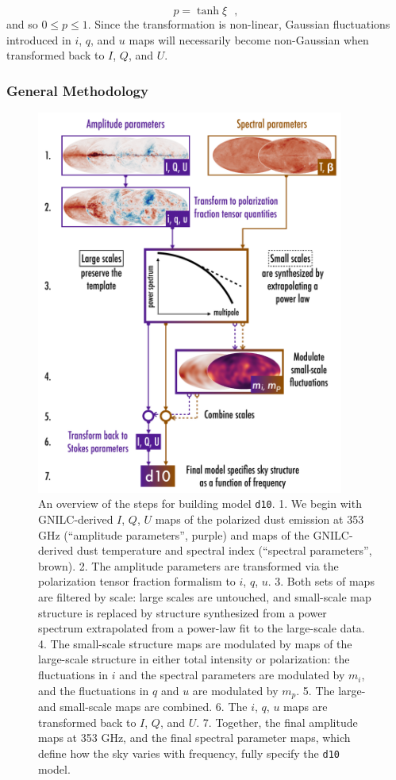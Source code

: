 \documentclass[twocolumn]{aastex631}
\begin{document}
\begin{equation}
    p = \tanh\xi
    ~~~,
\end{equation}
and so $0 \leq p \leq 1$. Since the transformation is non-linear, Gaussian fluctuations introduced in $i$, $q$, and $u$ maps will necessarily become non-Gaussian when transformed back to $I$, $Q$, and $U$.

\subsubsection{General Methodology}\label{subsec:methodology}

\begin{figure}
    \includegraphics[width=0.9\textwidth]{figures/flowchart_fig_larger_scalesep_schematic_cartoonscalesep_final.pdf}
    \caption{An overview of the steps for building model \texttt{d10}. 1. We begin with GNILC-derived $I$, $Q$, $U$ maps of the polarized dust emission at 353 GHz (``amplitude parameters'', purple) and maps of the GNILC-derived dust temperature and spectral index (``spectral parameters'', brown).  2. The amplitude parameters are transformed via the polarization tensor fraction formalism to $i$, $q$, $u$. 3. Both sets of maps are filtered by scale: large scales are untouched, and small-scale map structure is replaced by structure synthesized from a power spectrum extrapolated from a power-law fit to the large-scale data. 4. The small-scale structure maps are modulated by maps of the large-scale structure in either total intensity or polarization: the fluctuations in $i$ and the spectral parameters are modulated by $m_i$, and the fluctuations in $q$ and $u$ are modulated by $m_p$. 5. The large- and small-scale maps are combined. 6. The $i$, $q$, $u$ maps are transformed back to $I$, $Q$, and $U$. 7. Together, the final amplitude maps at 353 GHz, and the final spectral parameter maps, which define how the sky varies with frequency, fully specify the \texttt{d10} model.}

\end{figure}
\end{document}
